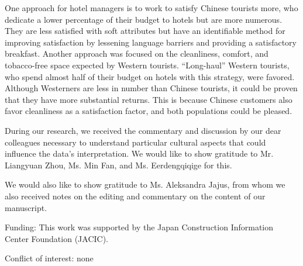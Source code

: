 \documentclass[smallextended,natbib]{svjour3}       %
\begin{document}
  One approach for hotel managers is to work to satisfy Chinese tourists more, who dedicate a lower percentage of their budget to hotels but are more numerous. They are less satisfied with soft attributes but have an identifiable method for improving satisfaction by lessening language barriers and providing a satisfactory breakfast. Another approach was focused on the cleanliness, comfort, and tobacco-free space expected by Western tourists. ``Long-haul'' Western tourists, who spend almost half of their budget on hotels with this strategy, were favored. Although Westerners are less in number than Chinese tourists, it could be proven that they have more substantial returns. This is because Chinese customers also favor cleanliness as a satisfaction factor, and both populations could be pleased.

\begin{acknowledgements}

  During our research, we received the commentary and discussion by our dear colleagues necessary to understand particular cultural aspects that could influence the data's interpretation. We would like to show gratitude to Mr. Liangyuan Zhou, Ms. Min Fan, and Ms. Eerdengqiqige for this. 

  We would also like to show gratitude to Ms. Aleksandra Jajus, from whom we also received notes on the editing and commentary on the content of our manuscript.

  Funding: This work was supported by the Japan Construction Information Center Foundation (JACIC).

  Conflict of interest: none

\end{acknowledgements}



\end{document}
